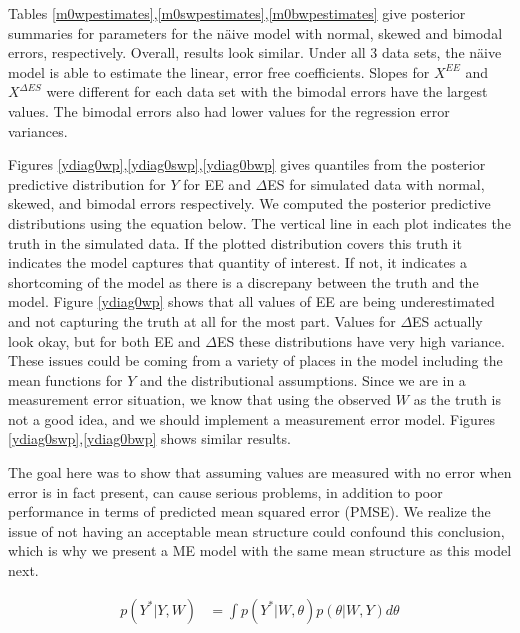 \documentclass[11pt]{article}\usepackage[]{graphicx}\usepackage[]{color}
\begin{document}
Tables \ref{m0wpestimates},\ref{m0swpestimates},\ref{m0bwpestimates} give posterior summaries for parameters for the n{\"a}ive model with normal, skewed and bimodal errors, respectively. Overall, results look similar. Under all 3 data sets, the n{\"a}ive model is able to estimate the linear, error free coefficients. Slopes for $X^{EE}$ and $X^{\Delta ES}$ were different for each data set with the bimodal errors have the largest values. The bimodal errors also had lower values for the regression error variances.


Figures \ref{ydiag0wp},\ref{ydiag0swp},\ref{ydiag0bwp} gives quantiles from the posterior predictive distribution for $Y$ for EE and $\Delta$ES for simulated data with normal, skewed, and bimodal errors respectively. We computed the posterior predictive distributions using the equation below. The vertical line in each plot indicates the truth in the simulated data. If the plotted distribution covers this truth it indicates the model captures that quantity of interest. If not, it indicates a shortcoming of the model as there is a discrepany between the truth and the model. Figure \ref{ydiag0wp} shows that all values of EE are being underestimated and not capturing the truth at all for the most part. Values for $\Delta$ES actually look okay, but for both EE and $\Delta$ES these distributions have very high variance. These issues could be coming from a variety of places in the model including the mean functions for $Y$ and the distributional assumptions. Since we are in a measurement error situation, we know that using the observed $W$ as the truth is not a good idea, and we should implement a measurement error model. Figures \ref{ydiag0swp},\ref{ydiag0bwp} shows similar results. 

The goal here was to show that assuming values are measured with no error when error is in fact present, can cause serious problems, in addition to poor performance in terms of predicted mean squared error (PMSE). We realize the issue of not having an acceptable mean structure could confound this conclusion, which is why we present a ME model with the same mean structure as this model next.

 \begin{align}
   \label{ypostpred0}
   p(Y^*|Y,W) &= \int p(Y^*|W,\theta) p(\theta|W,Y) d\theta
 \end{align}
\end{document}
